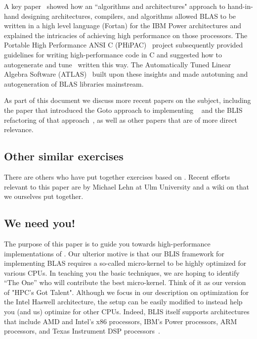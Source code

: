 A key paper~\cite{IBM:P2} showed how an ``algorithms and architectures" approach to hand-in-hand designing architectures, compilers, and algorithms allowed 
BLAS to be written in a high level language (Fortan) for the IBM Power architectures and explained the intricacies of achieving high performance on those processors.
The Portable High Performance ANSI C (PHiPAC)~\cite{PHiPAC97} project subsequently provided guidelines for writing high-performance code in C and suggested how to autogenerate and tune \Gemm\ written this way.  The Automatically Tuned Linear Algebra Software (ATLAS)~\cite{ATLAS,ATLAS_journal} built upon these insights and made autotuning and autogeneration of BLAS libraries mainstream.

As part of this document we discuss more recent papers on the subject, including the paper that introduced the Goto approach to implementing \Gemm~\cite{Goto:2008:AHP} and the BLIS refactoring of that approach~\cite{BLIS1}, as well as other papers that are of more direct relevance.  

\subsection{Other similar exercises}

There are others who have put together exercises based on {\Gemm}.
Recent efforts relevant to this paper are
by Michael Lehn at Ulm University and  a wiki on 
 that we ourselves put together.
 

\subsection{We need you!}

The purpose of this paper is to guide you towards high-performance
implementations of \Gemm.  Our ulterior motive is that our BLIS framework for implementing BLAS requires a so-called micro-kernel to be highly optimized for various CPUs.  In teaching you the basic techniques, we are hoping to identify  ``The One'' who will contribute the best micro-kernel.
Think of it as our version of "HPC's Got Talent".
Although  we focus in our description on optimization for the Intel Haswell architecture, the setup can be easily modified to instead help you (and us) optimize for other CPUs.  Indeed, BLIS itself supports architectures that include AMD and Intel's x86 processors, IBM's Power processors, ARM processors, and Texas Instrument DSP processors~\cite{BLIS2,BLIS3,BLIS-TI}.
